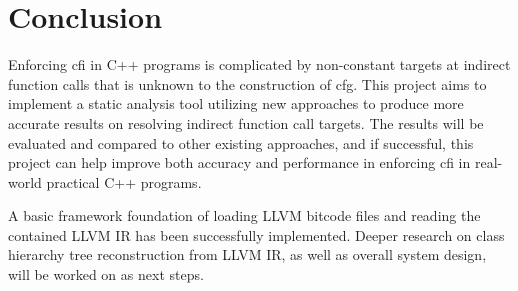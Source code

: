 \chapter{Conclusion}
\label{chapter:conclusion}

Enforcing \ac{cfi} in C++ programs is complicated by non-constant targets at indirect function calls that is unknown to the construction of \ac{cfg}. This project aims to implement a static analysis tool utilizing new approaches to produce more accurate results on resolving indirect function call targets. The results will be evaluated and compared to other existing approaches, and if successful, this project can help improve both accuracy and performance in enforcing \ac{cfi} in real-world practical C++ programs.

A basic framework foundation of loading LLVM bitcode files and reading the contained LLVM IR has been successfully implemented. Deeper research on class hierarchy tree reconstruction from LLVM IR, as well as overall system design, will be worked on as next steps.